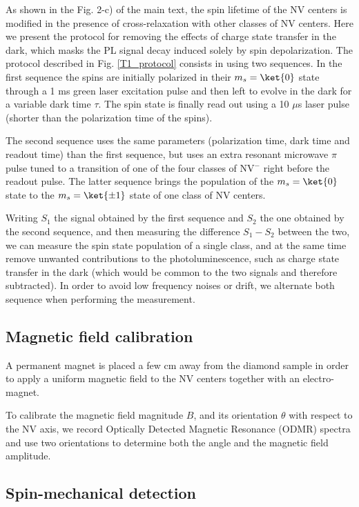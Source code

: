 \documentclass[preprintnumbers,amsmath,amssymb,onecolumn,12pt]{revtex4}
\begin{document}
As shown in the Fig. 2-c) of the main text, the spin lifetime of the NV centers is modified in the presence of cross-relaxation with other classes of NV centers.
Here we present the protocol for removing the effects of charge state transfer in the dark, which masks the PL signal decay induced solely by spin depolarization. 
The protocol described in Fig. \ref{T1_protocol} consists in using two sequences. In the first sequence the spins are initially polarized in their $m_s=\ket{0}$ state through a 1 ms green laser excitation pulse and then left to evolve in the dark for a variable dark time $\tau$. The spin state is finally read out using a 10 $\mu$s laser pulse (shorter than the polarization time of the spins).

The second sequence uses the same parameters (polarization time, dark time and readout time) than the first sequence, but uses an extra resonant microwave $\pi$ pulse tuned to a transition of one of the four classes of NV$^-$ right before the readout pulse. The latter sequence brings the population of the $m_s=\ket{0}$ state to the $m_s=\ket{\pm 1}$ state of one class of NV centers.

Writing $S_1$ the signal obtained by the first sequence and $S_2$ the one obtained by the second sequence, and then measuring the difference $S_1-S_2$ between the two, we can measure the spin state population of a single class, and at the same time remove unwanted contributions to the photoluminescence, such as charge state transfer in the dark (which would be common to the two signals and therefore subtracted).
In order to avoid low frequency noises or drift, we alternate both sequence when performing the measurement.

\subsection{Magnetic field calibration}

A permanent magnet is placed a few cm away from the diamond sample in order to apply a uniform magnetic field to the NV centers together with an electro-magnet.

To calibrate the magnetic field magnitude $B$, and its orientation $\theta$ with respect to the NV axis, we record Optically Detected Magnetic Resonance (ODMR) spectra and use two orientations to determine both the angle and the magnetic field amplitude. 

\subsection{Spin-mechanical detection}
\end{document}

